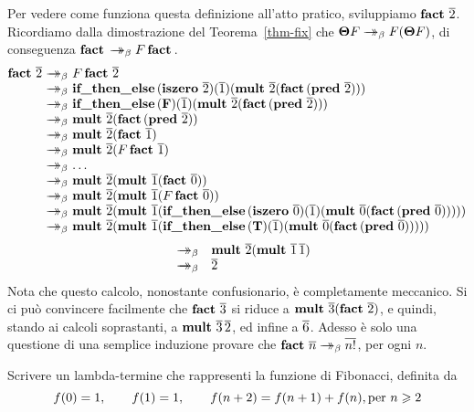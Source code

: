 \documentclass{article}
\begin{document}
Per vedere come funziona questa definizione all'atto pratico, sviluppiamo $\mathop{\textbf{\bf fact}\,}
\mathop{\overline{2}}$. Ricordiamo dalla dimostrazione del Teorema~\ref{thm-fix} che
$\textbf{\boldmath $\Theta$} F\mathrel{\rightarrow\!\!\!\!\!\rightarrow}_{\beta} F(\textbf{\boldmath $\Theta$} F)$, di conseguenza $\mathop{\textbf{\bf fact}\,} \mathrel{\rightarrow\!\!\!\!\!\rightarrow}_{\beta} F\mathop{\textbf{\bf fact}\,}$.
\[ \begin{array}{@{}r@{~}c@{~}l@{}}
  \factt\chnum{2}
  &\redbs& F\factt\chnum{2} \\
  &\redbs& \ifthenelset(\iszerot \chnum{2}) (\chnum{1}) 
  (\multt \chnum{2} (\factt (\predt \chnum{2}))) \\
  &\redbs& \ifthenelset (\falset) (\chnum{1}) 
  (\multt \chnum{2} (\factt (\predt \chnum{2}))) \\
  &\redbs& \multt \chnum{2} (\factt (\predt \chnum{2})) \\
  &\redbs& \multt \chnum{2} (\factt \chnum{1}) \\
  &\redbs& \multt \chnum{2} (F\factt \chnum{1}) \\
  &\redbs& \ldots \\
  &\redbs& \multt \chnum{2} (\multt \chnum{1} (\factt\chnum{0})) \\
  &\redbs& \multt \chnum{2} (\multt \chnum{1} (F\factt\chnum{0})) \\
  &\redbs& \multt \chnum{2} (\multt \chnum{1} (\ifthenelset(\iszerot
  \chnum{0}) (\chnum{1}) (\multt \chnum{0} (\factt (\predt \chnum{0}))))) \\
  &\redbs& \multt \chnum{2} (\multt \chnum{1} (\ifthenelset(\truet)
  (\chnum{1}) (\multt \chnum{0} (\factt (\predt \chnum{0}))))) \\
\end{array}\]\[\begin{array}{rcl}
  &\redbs& \multt \chnum{2} (\multt \chnum{1} \chnum{1}) \\
  &\redbs& \chnum{2}
\end{array}
\]
Nota che questo calcolo, nonostante confusionario, \`e completamente meccanico.
Si ci pu\`o convincere facilmente che $\mathop{\textbf{\bf fact}\,} \mathop{\overline{3}}$ si riduce a
$\mathop{\textbf{\bf mult}\,} \mathop{\overline{3}} (\mathop{\textbf{\bf fact}\,} \mathop{\overline{2}})$, e quindi, stando ai calcoli
soprastanti, a $\mathop{\textbf{\bf mult}\,} \mathop{\overline{3}} \mathop{\overline{2}}$, ed infine a
$\mathop{\overline{6}}$. Adesso \`e solo una questione di una semplice induzione provare che
$\mathop{\textbf{\bf fact}\,} \mathop{\overline{n}}\mathrel{\rightarrow\!\!\!\!\!\rightarrow}_{\beta} \mathop{\overline{n!}}$, per ogni $n$.

\begin{exercise}
  Scrivere un lambda-termine che rappresenti la
  funzione di Fibonacci, definita da
  \[ f(0) = 1,\hspace{2em} f(1) = 1,\hspace{2em} f(n+2)=f(n+1)+f(n), \mbox{per $n\geqslant 2$}
  \]
\end{exercise}
\end{document}
